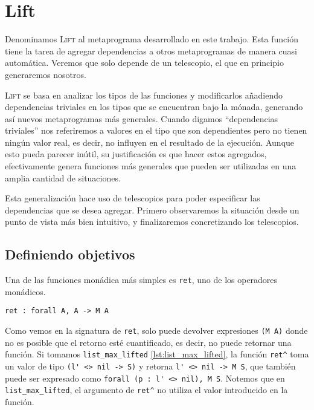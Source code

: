 \chapter{Lift}\label{ch:lift}

Denominamos \textsc{Lift} al metaprograma desarrollado en este trabajo.
Esta función tiene la tarea de agregar dependencias a otros metaprogramas de manera cuasi automática. Veremos que solo depende de un telescopio, el que en principio generaremos nosotros.

\textsc{Lift} se basa en analizar los tipos de las funciones y modificarlos añadiendo dependencias triviales en los tipos que se encuentran bajo la mónada, generando así nuevos metaprogramas más generales.
Cuando digamos ``dependencias triviales'' nos referiremos a valores en el tipo que son dependientes pero no tienen ningún valor real, es decir, no influyen en el resultado de la ejecución.
Aunque esto pueda parecer inútil, su justificación es que hacer estos agregados, efectivamente genera funciones más generales que pueden ser utilizadas en una amplia cantidad de situaciones. 

Esta generalización hace uso de telescopios para poder especificar las dependencias que se desea agregar.
Primero observaremos la situación desde un punto de vista más bien intuitivo, y finalizaremos concretizando los telescopios.

\section{Definiendo objetivos}

Una de las funciones monádica más simples es \lstinline{ret}, uno de los operadores monádicos.

\begin{lstlisting}[frame=tb,caption={Signatura de \lstinline{ret}},label=lst:ret]
ret : forall A, A -> M A
\end{lstlisting}

Como vemos en la signatura de \lstinline{ret}, solo puede devolver expresiones \lstinline{(M A)} donde no es posible que el retorno esté cuantificado, es decir, no puede retornar una función.
Si tomamos \lstinline{list_max_lifted} \ref{lst:list_max_lifted}, la función \lstinline{ret^} toma un valor de tipo \lstinline{(l' <> nil -> S)} y retorna \lstinline{l' <> nil -> M S}, que también puede ser expresado como \lstinline{forall (p : l' <> nil), M S}.
Notemos que en \lstinline{list_max_lifted}, el argumento de \lstinline{ret^} no utiliza el valor introducido en la función.

